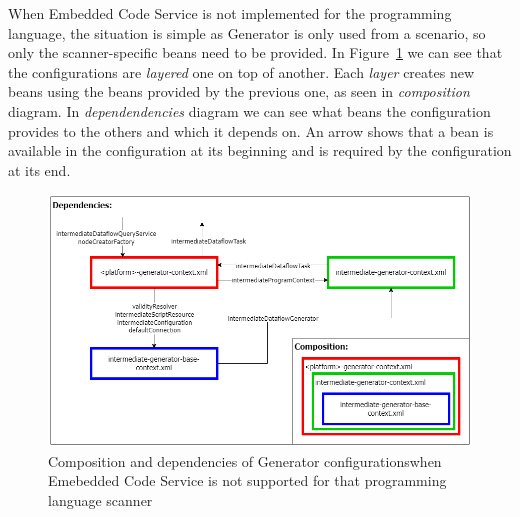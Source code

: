 \par
When Embedded Code Service is not implemented for the programming language, the situation is simple as Generator is only used from a scenario, so only the scanner-specific beans need to be provided. In Figure~\ref{fig:generatorNoECS} we can see that the configurations are \textit{layered} one on top of another. Each \textit{layer} creates new beans using the beans provided by the previous one, as seen in \textit{composition} diagram. In \textit{dependendencies} diagram we can see what beans the configuration provides to the others and which it depends on. An arrow shows that a bean is available in the configuration at its beginning and is required by the configuration at its end.
\begin{figure}[ht]\centering
\includegraphics[width=1.0\textwidth]{img/generator_no_ECS.png}
\caption{Composition and dependencies of Generator configurationswhen Emebedded Code Service is not supported for that programming language scanner}
\label{fig:generatorNoECS}
\end{figure} 

